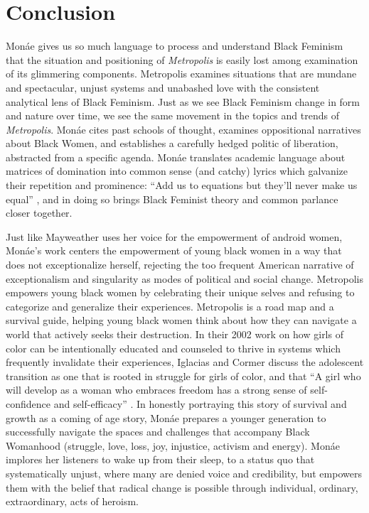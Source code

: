 \documentclass[a4paper, 11pt]{article} %
\begin{document}

\section*{Conclusion}

Mon\'ae gives us so much language to process and understand Black Feminism that the situation and positioning of \emph{Metropolis} is easily lost among examination of its glimmering components.
Metropolis examines situations that are mundane and spectacular, unjust systems and unabashed love with the consistent analytical lens of Black Feminism.
Just as we see Black Feminism change in form and nature over time, we see the same movement in the topics and trends of \emph{Metropolis}.
Mon\'ae cites past schools of thought, examines oppositional narratives about Black Women, and establishes a carefully hedged politic of liberation, abstracted from a specific agenda. 
Mon\'ae translates academic language about matrices of domination into common sense (and catchy) lyrics which galvanize their repetition and prominence: ``Add us to equations but they'll never make us equal'' \cite{queen}, and in doing so brings Black Feminist theory and common parlance closer together.

Just like Mayweather uses her voice for the empowerment of android women, Mon\'ae's work centers the empowerment of young black women in a way that does not exceptionalize herself, rejecting the too frequent American narrative of exceptionalism and singularity as modes of political and social change. 
Metropolis empowers young black women by celebrating their unique selves and refusing to categorize and generalize their experiences. 
Metropolis is a road map and a survival guide, helping young black women think about how they can navigate a world that actively seeks their destruction.
In their 2002 work on how girls of color can be intentionally educated and counseled to thrive in systems which frequently invalidate their experiences, Iglacias and Cormer discuss the adolescent transition as one that is rooted in struggle for girls of color, and that ``A girl who will develop as a woman who embraces freedom has a strong sense of self-confidence and self-efficacy'' \cite{iglesiascormier}.
In honestly portraying this story of survival and growth as a coming of age story, Mon\'ae prepares a younger generation to successfully navigate the spaces and challenges that accompany Black Womanhood (struggle, love, loss, joy, injustice, activism and energy).
Mon\'ae implores her listeners to wake up from their sleep, to a status quo that systematically unjust, where many are denied voice and credibility, but empowers them with the belief that radical change is possible through individual, ordinary, extraordinary, acts of heroism.
\end{document}
